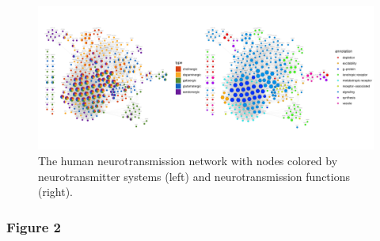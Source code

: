 \begin{figure}

{\centering \includegraphics{figs/analysis.network.unnamed-chunk-8-1} 

}

\caption{The human neurotransmission network with nodes colored by neurotransmitter systems (left) and neurotransmission functions (right).}\label{fig:unnamed-chunk-8}
\end{figure}

\begin{Shaded}
\begin{Highlighting}[]
\NormalTok{(}\NormalTok{, } \NormalTok{, } \NormalTok{, }
\end{Highlighting}
\end{Shaded}

\hypertarget{figure-2}{%
\subsubsection{Figure 2}\label{figure-2}}

